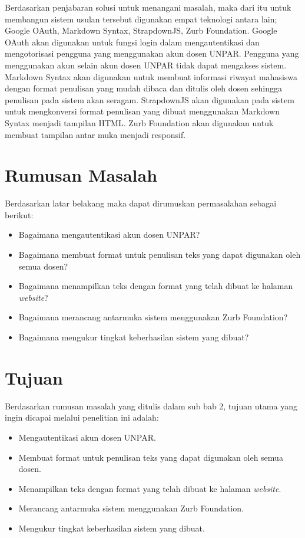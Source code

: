Berdasarkan penjabaran solusi untuk menangani masalah, maka dari itu untuk membangun sistem usulan tersebut digunakan empat teknologi antara lain; Google OAuth, Markdown Syntax, StrapdownJS, Zurb Foundation. Google OAuth akan digunakan untuk fungsi login dalam mengautentikasi dan mengotorisasi pengguna yang menggunakan akun dosen UNPAR. Pengguna yang menggunakan akun selain akun dosen UNPAR tidak dapat mengakses sistem. Markdown Syntax akan digunakan untuk membuat informasi riwayat mahasiswa dengan format penulisan yang mudah dibaca dan ditulis oleh dosen sehingga penulisan pada sistem akan seragam. StrapdownJS akan digunakan pada sistem untuk mengkonversi format penulisan yang dibuat menggunakan Markdown Syntax menjadi tampilan HTML. Zurb Foundation akan digunakan untuk membuat tampilan antar muka menjadi responsif.

\section{Rumusan Masalah}
Berdasarkan latar belakang maka dapat dirumuskan permasalahan sebagai berikut:
\begin{itemize}
	\item Bagaimana mengautentikasi akun dosen UNPAR?
	\item Bagaimana membuat format untuk penulisan teks yang dapat digunakan oleh semua dosen?
	\item Bagaimana menampilkan teks dengan format yang telah dibuat ke halaman {\it website}?
	\item Bagaimana merancang antarmuka sistem menggunakan Zurb Foundation?
	\item Bagaimana mengukur tingkat keberhasilan sistem yang dibuat?
\end{itemize}

\section{Tujuan}
Berdasarkan rumusan masalah yang ditulis dalam sub bab 2, tujuan utama yang
ingin dicapai melalui penelitian ini adalah:
\begin{itemize}
	\item Mengautentikasi akun dosen UNPAR.
	\item Membuat format untuk penulisan teks yang dapat digunakan oleh semua dosen.
	\item Menampilkan teks dengan format yang telah dibuat ke halaman {\it website}.
	\item Merancang antarmuka sistem menggunakan Zurb Foundation.
	\item Mengukur tingkat keberhasilan sistem yang dibuat.
\end{itemize}

